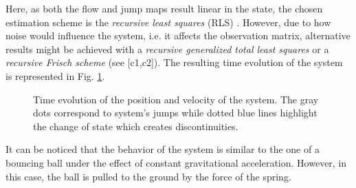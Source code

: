 Here, as both the flow and jump maps result linear in the state, the chosen estimation scheme is the \textit{recursive least squares} (RLS) \cite{ljung1987system}. However, due to how noise would influence the system, i.e. it affects the observation matrix, alternative results might be achieved with a \textit{recursive generalized total least squares} \citep{RHODE20144637} or a \textit{recursive Frisch scheme} (see [c1,c2]). The resulting time evolution of the system is represented in Fig. \ref{fig:trj}. 
\begin{figure}
	\centering
    
	\caption[Time evolution of the position and velocity of the system.]{Time evolution of the position and velocity of the system. The gray dots correspond to system's jumps while dotted blue lines highlight the change of state which creates discontinuities.}
	\label{fig:trj}
\end{figure}
%
%
%
It can be noticed that the behavior of the system is similar to the one of a bouncing ball under the effect of constant gravitational acceleration. However, in this case, the ball is pulled to the ground by the force of the spring.

